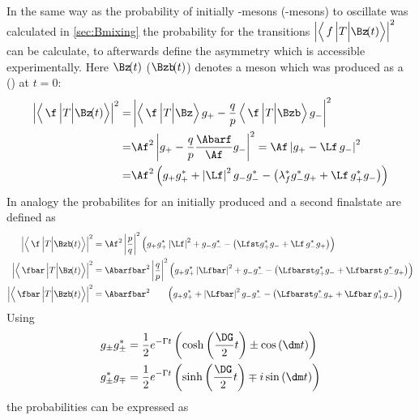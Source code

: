 In the same way as the probability of initially \B-mesons (\Bzb-mesons) to oscillate was calculated in \cref{sec:Bmixing} the
probability for the transitions $\left|\left<\,f\,\Big|T\Big|\Bz\!(t)\right>\right|^2$ can be calculate, to afterwards define the
\CP asymmetry which is accessible experimentally. Here $\Bz\!(t)$ ($\Bzb\!(t)$) denotes a \B meson which was produced as a \Bz
(\Bzb) at $t=0$:
\begin{align}
\left|\left<\,\f\,\Big|T\Big|\Bz\!(t)\right>\right|^2 =&
\left|\left<\,\f\,\Big|T\Big|\Bz\right>g_+-\frac{q}{p}\left<\,\f\,\Big|T\Big|\Bzb\right>g_-\right|^2\nonumber\\
=&\Af^2\left|g_+ - \frac{q}{p}\frac{\Abarf}{\Af} g_-\right|^2=\Af\left|g_+ -\Lf\,g_-\right|^2\nonumber\\
=&\Af^2\left(g_+g_+^*+\left|\Lf\right|^2g_-g_-^*-\left(\lambda_{f}^*g_-^*g_+ + \Lf\,g_+^* g_-\right)\right)
\end{align}
In analogy the probabilites for an initially produced \Bzb and a second finalstate \fbar are defined as
\begin{align}
\left|\left<\,\f\,\Big|T\Big|\Bzb\!(t)\right>\right|^2 &=
\Af^2\left|\frac{p}{q}\right|^2\left(g_+g_+^*\left|\Lf\right|^2+g_-g_-^*-\left(\Lfst g_+^*g_- + \Lf\,g_-^* g_+\right)\right)\\
\left|\left<\,\fbar\,\Big|T\Big|\Bz\!(t)\right>\right|^2 &=
\Abarfbar^2\left|\frac{q}{p}\right|^2\left(g_+g_+^*\left|\Lfbar\right|^2+g_-g_-^*-\left(\Lfbarst g_+^*g_- + \Lfbarst\,g_-^* g_+\right)\right)\\
\left|\left<\,\fbar\,\Big|T\Big|\Bzb\!(t)\right>\right|^2 &=
\Abarfbar^2\hphantom{\left|\frac{q}{p}\right|^2}\left(g_+g_+^*+\left|\Lfbar\right|^2g_-g_-^*-\left(\Lfbarst g_-^*g_+ + \Lfbar\,g_+^* g_-\right)\right)
\end{align}
Using
\begin{align}
g_{\pm}g_{\pm}^{*} &= \frac{1}{2}e^{-\Gamma t}\left(\cosh\left(\frac{\DG}{2}t\right)\pm\cos\left(\dm t\right)\right)\\
g_{\pm}^*g_{\mp} &=  \frac{1}{2}e^{-\Gamma t}\left(\sinh\left(\frac{\DG}{2}t\right)\mp i\sin\left(\dm t\right)\right)
\end{align}
the probabilities can be expressed as
